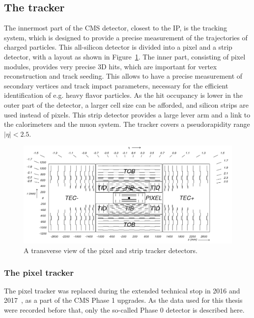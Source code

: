 \subsection{The tracker}

The innermost part of the \ac{CMS} detector, closest to the \ac{IP}, is the tracking system, which is designed to provide a precise measurement of the trajectories of charged particles. This all-silicon detector is divided into a pixel and a strip detector, with a layout as shown in Figure~\ref{fig:cmstracker}. The inner part, consisting of pixel modules, provides very precise 3D hits, which are important for vertex reconstruction and track seeding. This allows to have a precise measurement of secondary vertices and track impact parameters, necessary for the efficient identification of e.g. heavy flavor particles. As the hit occupancy is lower in the outer part of the detector, a larger cell size can be afforded, and silicon strips are used instead of pixels. This strip detector provides a large lever arm and a link to the calorimeters and the muon system. The tracker covers a pseudorapidity range $|\eta| < 2.5$.

\begin{figure}[ht]
  \centering
 \includegraphics[width=.9\textwidth]{fig_cmstracker}
 \caption{A transverse view of the pixel and strip tracker detectors.}
 \label{fig:cmstracker}
\end{figure}

\subsubsection{The pixel tracker} 

The pixel tracker was replaced during the extended technical stop in 2016 and 2017~\cite{CMS:2012sda}, as a part of the \ac{CMS} Phase 1 upgrades. As the data used for this thesis were recorded before that, only the so-called Phase 0 detector is described here. 

